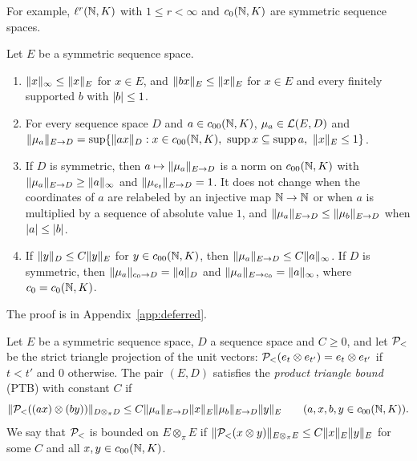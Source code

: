 For example, $\ell^r(\mathbb N,K)$ with $1\le r<\infty$ and $c_0(\mathbb N,K)$ are symmetric sequence spaces.

\begin{lemma}\label{obs:lem:multiplier}
Let $E$ be a symmetric sequence space.
\begin{enumerate}
\item $\lVert x\rVert_\infty\le\lVert x\rVert_E$ for $x\in E$, and $\lVert bx\rVert_E\le\lVert x\rVert_E$ for $x\in E$ and every finitely
supported $b$ with $\lvert b\rvert\le1$.
\item For every sequence space $D$ and $a\in c_{00}(\mathbb N,K)$, $\mu_a\in\mathcal L(E,D)$ and
$\lVert \mu_a\rVert_{E\to D}=\sup\{\lVert ax\rVert_D:x\in c_{00}(\mathbb N,K),\ \operatorname{supp}x\subseteq\operatorname{supp}a,\
\lVert x\rVert_E\le1\}$.
\item If $D$ is symmetric, then $a\mapsto\lVert \mu_a\rVert_{E\to D}$ is a norm on $c_{00}(\mathbb N,K)$ with
$\lVert \mu_a\rVert_{E\to D}\ge\lVert a\rVert_\infty$ and $\lVert \mu_{e_t}\rVert_{E\to D}=1$. It does not change when the coordinates
of $a$ are relabeled by an injective map $\mathbb N\to\mathbb N$ or when $a$ is multiplied by a sequence of absolute value $1$, and
$\lVert \mu_a\rVert_{E\to D}\le\lVert \mu_b\rVert_{E\to D}$ when $\lvert a\rvert\le\lvert b\rvert$.
\item If $\lVert y\rVert_D\le C\lVert y\rVert_E$ for $y\in c_{00}(\mathbb N,K)$, then $\lVert \mu_a\rVert_{E\to D}\le C\lVert a\rVert_\infty$. If $D$ is
symmetric, then $\lVert \mu_a\rVert_{c_0\to D}=\lVert a\rVert_D$ and $\lVert \mu_a\rVert_{E\to c_0}=\lVert a\rVert_\infty$, where $c_0=c_0(\mathbb N,K)$.
\end{enumerate}
\end{lemma}

The proof is in Appendix~\ref{app:deferred}.

\begin{definition}\label{obs:def:ptb}
Let $E$ be a symmetric sequence space, $D$ a sequence space and $C\ge0$, and let $\mathcal P_<$ be the strict triangle
projection of the unit vectors: $\mathcal P_<(e_t\otimes e_{t'})=e_t\otimes e_{t'}$ if $t<t'$ and $0$ otherwise. The pair $(E,D)$
satisfies the \emph{product triangle bound} \textup{(PTB)} with constant $C$ if
\begin{equation}\label{obs:eq:ptb}
 \lVert \mathcal P_<((ax)\otimes(by))\rVert_{D\otimes_\pi D}\le C\lVert \mu_a\rVert_{E\to D}\lVert x\rVert_E\lVert \mu_b\rVert_{E\to D}\lVert y\rVert_E
 \qquad(a,x,b,y\in c_{00}(\mathbb N,K)).
\end{equation}
We say that $\mathcal P_<$ is bounded on $E\otimes_\pi E$ if $\lVert \mathcal P_<(x\otimes y)\rVert_{E\otimes_\pi E}\le C\lVert x\rVert_E\lVert y\rVert_E$
for some $C$ and all $x,y\in c_{00}(\mathbb N,K)$.
\end{definition}

